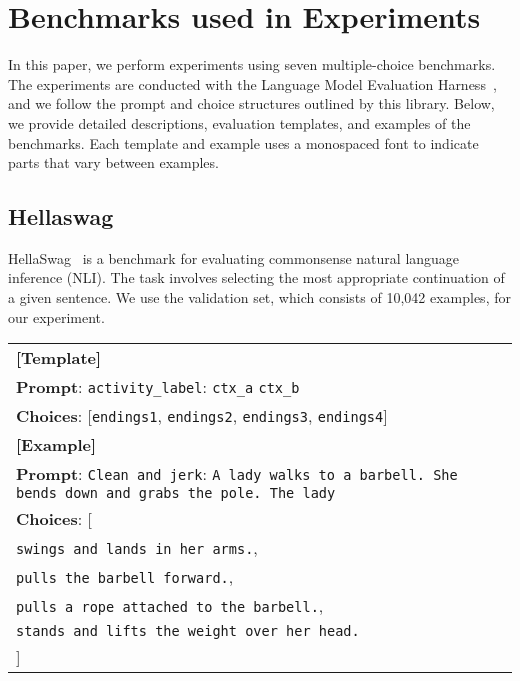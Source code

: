 \clearpage
\appendix
\section{Benchmarks used in Experiments}
\label{sec:app-benchmark}
In this paper, we perform experiments using seven multiple-choice benchmarks. The experiments are conducted with the Language Model Evaluation Harness~\cite{eval-harness}, and we follow the prompt and choice structures outlined by this library. Below, we provide detailed descriptions, evaluation templates, and examples of the benchmarks. Each template and example uses a monospaced font to indicate parts that vary between examples.

\subsection{Hellaswag}
HellaSwag~\cite{hellaswag} is a benchmark for evaluating commonsense natural language inference (NLI). The task involves selecting the most appropriate continuation of a given sentence. We use the validation set, which consists of 10,042 examples, for our experiment.

\begin{table}[H]
\centering
\begin{small}
\begin{tabular}{|p{7cm}|}
\hline
\textbf{[Template]} \\
\textbf{Prompt}: \texttt{activity\_label}: \texttt{ctx\_a} \texttt{ctx\_b} \\
\textbf{Choices}: [\texttt{endings1}, \texttt{endings2}, \texttt{endings3}, \texttt{endings4}] \\ \hline
\textbf{[Example]} \\
\textbf{Prompt}: \texttt{Clean and jerk}: \texttt{A lady walks to a barbell. She bends down and grabs the pole. The lady} \\
\textbf{Choices}: [\\
\hspace*{2em}\texttt{swings and lands in her arms.},\\
\hspace*{2em}\texttt{pulls the barbell forward.},\\
\hspace*{2em}\texttt{pulls a rope attached to the barbell.},\\
\hspace*{2em}\texttt{stands and lifts the weight over her head.}\\
    ] \\ \hline
\end{tabular}
\end{small}
\end{table}

